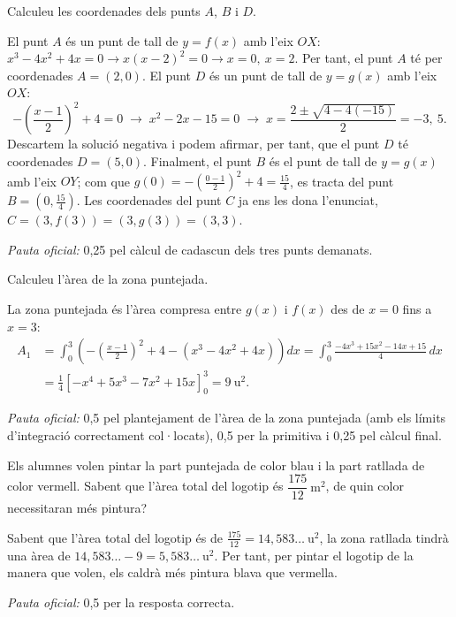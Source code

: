 \begin{apartats}

Calculeu les coordenades dels punts $A$, $B$ i $D$.

\begin{solucio}
El punt $A$ és un punt de tall de $y=f(x)$ amb l'eix $OX$: $x^3-4x^2+4x=0\rightarrow x(x-2)^2=0\rightarrow
x=0,\ x=2$. Per tant, el punt $A$ té per coordenades $A=(2,0)$. El punt $D$ és un punt de tall de $y=g(x)$ amb
l'eix $OX$:
\[
-\left(\frac{x-1}{2}\right)^2+4=0\;\rightarrow\;x^2-2x-15=0\;\rightarrow\;x=\frac{2\pm\sqrt{4-4(-15)}}{2}=-3,\ 5 .
\]
Descartem la solució negativa i podem afirmar, per tant, que el punt $D$ té coordenades $D=(5,0)$.
Finalment, el punt $B$ és el punt de tall de $y=g(x)$ amb l'eix $OY$; com que
$g(0)=-\left(\frac{0-1}{2}\right)^2+4=\frac{15}{4}$, es tracta del punt $B=\left(0,\frac{15}{4}\right)$. Les
coordenades del punt $C$ ja ens les dona l'enunciat, $C=(3,f(3))=(3,g(3))=(3,3)$.

\textit{Pauta oficial:} 0,25 pel càlcul de cadascun dels tres punts demanats.
\end{solucio}

Calculeu l'àrea de la zona puntejada.

\begin{solucio}
La zona puntejada és l'àrea compresa entre $g(x)$ i $f(x)$ des de $x=0$ fins a $x=3$:
\begin{align*}
A_1&=\int_0^3\left(-\left(\frac{x-1}{2}\right)^2+4-\left(x^3-4x^2+4x\right)\right)dx
=\int_0^3\frac{-4x^3+15x^2-14x+15}{4}\,dx\\
&=\frac14\left[-x^4+5x^3-7x^2+15x\right]_0^3=9\ \text{u}^2 .
\end{align*}

\textit{Pauta oficial:} 0,5 pel plantejament de l'àrea de la zona puntejada (amb els límits d'integració
correctament col·locats), 0,5 per la primitiva i 0,25 pel càlcul final.
\end{solucio}

Els alumnes volen pintar la part puntejada de color blau i la part ratllada de color vermell. Sabent que l'àrea
total del logotip és $\dfrac{175}{12}\ \text{m}^2$, de quin color necessitaran més pintura?

\begin{solucio}
Sabent que l'àrea total del logotip és de $\frac{175}{12}=14{,}583\ldots\ \text{u}^2$, la zona ratllada tindrà
una àrea de $14{,}583\ldots-9=5{,}583\ldots\ \text{u}^2$. Per tant, per pintar el logotip de la manera que
volen, els caldrà més pintura blava que vermella.

\textit{Pauta oficial:} 0,5 per la resposta correcta.
\end{solucio}

\end{apartats}
